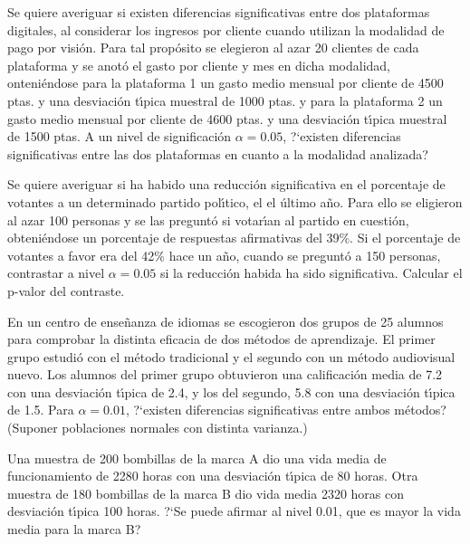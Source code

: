 \begin{prob}%
    Se quiere averiguar si existen diferencias significativas entre
    dos plataformas digitales, al considerar los ingresos por cliente
    cuando utilizan la modalidad de pago por visi\'on. Para tal
    prop\'osito se elegieron al azar 20 clientes de cada plataforma y
    se anot\'o el gasto por cliente y mes en dicha modalidad,
    onteni\'endose para la plataforma 1 un gasto medio mensual por cliente
    de 4500 ptas. y una desviaci\'on t\'{\i}pica muestral de 1000 ptas.
    y para la plataforma 2 un gasto medio mensual por cliente de 4600
    ptas. y una desviaci\'on t\'{\i}pica muestral de 1500 ptas. A un
    nivel de significaci\'on $\alpha = 0.05$, ?`existen diferencias
    significativas entre las dos plataformas en cuanto a la modalidad
    analizada?
\end{prob}

\begin{prob}%
    Se quiere averiguar si ha habido una reducci\'on significativa en
    el porcentaje de votantes a un determinado partido pol\'{\i}tico,
    el el \'ultimo a\~{n}o. Para ello se eligieron al azar 100
    personas y se las pregunt\'o si votar\'{\i}an al partido en
    cuesti\'on, obteni\'endose un porcentaje de respuestas
    afirmativas del 39\%. Si el porcentaje de votantes a favor era
    del 42\% hace un a\~{n}o, cuando se pregunt\'o a 150 personas,
    contrastar a nivel $\alpha = 0.05$ si la reducci\'on habida ha
    sido significativa. Calcular el p-valor del contraste.
\end{prob}

\begin{prob}%
    En un centro de ense\~{n}anza de idiomas se escogieron dos grupos
    de 25 alumnos para comprobar la distinta eficacia de dos
    m\'etodos de aprendizaje. El primer grupo estudi\'o con el
    m\'etodo tradicional y el segundo con un m\'etodo audiovisual
    nuevo. Los alumnos del primer grupo obtuvieron una calificaci\'on
    media de 7.2 con una desviaci\'on t\'{\i}pica de 2.4, y los del
    segundo, 5.8 con una desviaci\'on t\'{\i}pica de 1.5. Para
    $\alpha = 0.01$, ?`existen diferencias significativas entre ambos
    m\'etodos? (Suponer poblaciones normales con distinta varianza.)
\end{prob}

\begin{prob}%
    Una muestra de 200 bombillas de la marca A dio una vida media de
    funcionamiento de 2280 horas con una desviaci\'on t\'{\i}pica de
    80 horas. Otra muestra de 180 bombillas de la marca B dio vida
    media 2320 horas con desviaci\'on t\'{\i}pica 100 horas. ?`Se
    puede afirmar al nivel 0.01, que es mayor la vida media para la
    marca B?
\end{prob}

